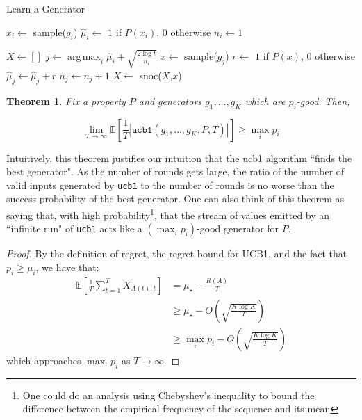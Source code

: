 \documentclass[10pt,a4paper]{article}
\newtheorem{theorem}{Theorem}
\DeclareMathOperator*{\argmax}{arg\,max}
\begin{document}
\begin{algorithm}
    \caption{Learn a Generator}
    \label{alg:ucb1}
    \begin{algorithmic}
      \State $x_i \gets $ sample($g_i$)
      \State $\hat{\mu}_i \gets$ $1$ if $P(x_i)$, $0$ otherwise
      \State $n_i \gets 1$

      \EndFor
      \State $X \gets []$
        \State $j \gets \argmax_i \hat{\mu}_i + \sqrt{\frac{2\log t}{n_i}}$
        \State $x \gets$ sample($g_j$)
        \State $r \gets$ $1$ if $P(x)$, $0$ otherwise
        \State $\hat{\mu}_j \gets \hat{\mu}_j + r$
        \State $n_j \gets n_j + 1$
        \State $X \gets$ snoc($X$,$x$)
      \EndFor
      \EndFunction
    \end{algorithmic}
\end{algorithm}

\begin{theorem}
Fix a property $P$ and generators $g_1,\dots,g_K$ which are $p_i$-good. Then,

$$
\lim_{T \to \infty} \mathbb{E}\left[\frac{1}{T}\left|\texttt{ucb1}(g_1,\dots,g_K,P,T)\right|\right] \geq \max_i p_i
$$
\end{theorem}
Intuitively, this theorem justifies our intuition that the ucb1 algorithm ``finds the best generator". As the number of rounds gets large, the ratio of the number of valid inputs generated by \texttt{ucb1} to the number of rounds is no worse than the success probability of the best generator. One can also think of this theorem as saying that, with high probability\footnote{One could do an analysis using Chebyshev's inequality to bound the difference between the empirical frequency of the sequence and its mean}, that the stream of values emitted by an ``infinite run" of \texttt{ucb1} acts like a $(\max_i p_i)$-good generator for $P$.
\begin{proof}
By the definition of regret, the regret bound for UCB1, and the fact that $p_i \geq \mu_i$, we have that:
\begin{align*}
\mathbb{E}\left[\frac{1}{T}\sum_{t=1}^T X_{A(t),t}\right] &= \mu_\star - \frac{R(A)}{T}\\
&\geq \mu_{\star} - O\left(\sqrt{\frac{K\log K}{T}}\right)\\
&\geq \max_i p_i - O\left(\sqrt{\frac{K\log K}{T}}\right)
\end{align*}
which approaches $\max_i p_i$ as $T \to \infty$.
\end{proof}
\end{document}
